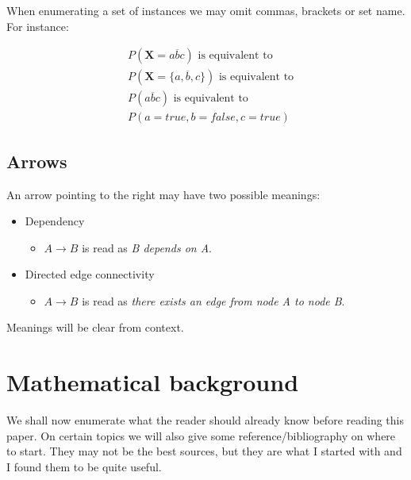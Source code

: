 \documentclass[a4paper,10pt]{article}
\theoremstyle{plain}
\begin{document}
\begin{appendices}
When enumerating a set of instances we may omit commas, brackets or set name. For instance:

\begin{align*}
  &P(\mathbf{X}=a\overline{b}c) \text{~is equivalent to} \\
  &P(\mathbf{X}=\{a, \overline{b}, c\}) \text{~is equivalent to} \\
  &P(a\overline{b}c) \text{~is equivalent to} \\
  &P(a=true,b=false,c=true)
\end{align*}

\subsection{Arrows}

An arrow pointing to the right may have two possible meanings:

\begin{itemize}
  \item Dependency
    \begin{itemize}
      \item $A \to B$ is read as \textit{B depends on A}.
    \end{itemize}
  \item Directed edge connectivity
    \begin{itemize}
      \item $A \to B$ is read as \textit{there exists an edge from node A to node B}.
    \end{itemize}
\end{itemize}

Meanings will be clear from context.

\section{Mathematical background}\label{app:bak}

We shall now enumerate what the reader should already know before reading this paper. On certain
topics we will also give some reference/bibliography on where to start. They may not be the best
sources, but they are what I started with and I found them to be quite useful.


\end{appendices}
\end{document}
